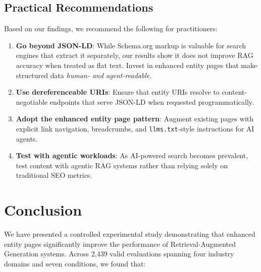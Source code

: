 \documentclass[runningheads]{llncs}
\begin{document}
\subsection{Practical Recommendations}

Based on our findings, we recommend the following for practitioners:

\begin{enumerate}
    \item \textbf{Go beyond JSON-LD}: While Schema.org markup is
          valuable for search engines that extract it separately, our
          results show it does not improve RAG accuracy when treated
          as flat text. Invest in enhanced entity pages that make
          structured data \emph{human- and agent-readable}.
    \item \textbf{Use dereferenceable URIs}: Ensure that entity URIs
          resolve to content-negotiable endpoints that serve JSON-LD
          when requested programmatically.
    \item \textbf{Adopt the enhanced entity page pattern}: Augment
          existing pages with explicit link navigation, breadcrumbs,
          and \texttt{llms.txt}-style instructions for AI agents.
    \item \textbf{Test with agentic workloads}: As AI-powered search
          becomes prevalent, test content with agentic RAG systems
          rather than relying solely on traditional SEO metrics.
\end{enumerate}

\section{Conclusion}
\label{sec:conclusion}

We have presented a controlled experimental study demonstrating that
enhanced entity pages significantly improve the performance of
Retrieval-Augmented Generation systems. Across 2,439 valid evaluations
spanning four industry domains and seven conditions, we found that:
\end{document}
